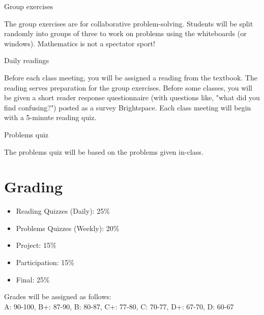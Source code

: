 \documentclass[letterpaper]{inzane_syllabus} %
\begin{document}

\vspace{0.1cm} 

{\color{myCOLOR} Group exercises}

The group exercises are for collaborative problem-solving.  Students will be split randomly into groups of three to work on problems using the whiteboards (or windows). Mathematics is not a spectator sport!

{\color{myCOLOR} Daily readings}

Before each class meeting, you will be assigned a reading from the textbook. The reading serves preparation for the group exercises. Before some classes, you will be given a short reader response questionnaire (with questions like, "what did you find confusing?") posted as a survey Brightspace.  Each class meeting will begin with a 5-minute reading quiz.


{\color{myCOLOR} Problems quiz}

The problems quiz will be based on the problems given in-class.



\newpage %

\makeSide %


\vspace{0.2cm}
\section{Grading}

\begin{itemize}
\item Reading Quizzes (Daily): 25\%  
\item Problems Quizzes (Weekly): 20\% 
\item Project: 15\% 
\item Participation: 15\% 
\item Final: 25\%
\end{itemize}

Grades will be assigned as follows: \\
A: 90-100, B+: 87-90, B: 80-87, C+: 77-80, C: 70-77, D+: 67-70, D: 60-67
\end{document}
